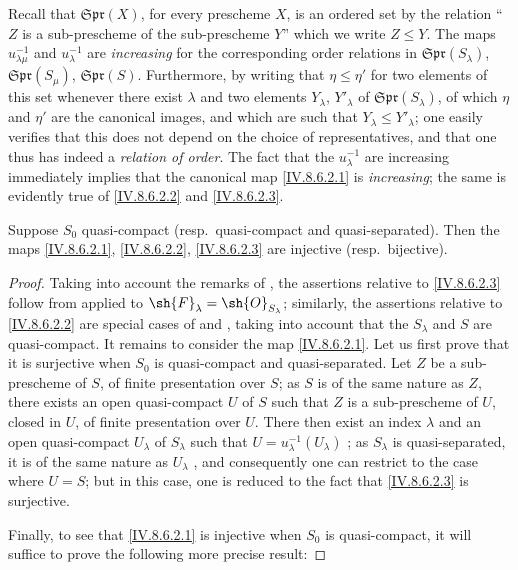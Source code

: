 
Recall  that $\mathfrak{Spr}(X)$, for every prescheme $X$, is an ordered set by the relation ``$Z$ is a sub-prescheme of the sub-prescheme $Y$'' which we write $Z\leqslant Y$.
The maps $u_{\lambda\mu}^{-1}$ and $u_\lambda^{-1}$ are \emph{increasing} for the corresponding order relations in $\mathfrak{Spr}(S_\lambda)$, $\mathfrak{Spr}(S_\mu)$, $\mathfrak{Spr}(S)$.
Furthermore, by writing that $\eta\leqslant\eta'$ for two elements of this set whenever there exist $\lambda$ and two elements $Y_\lambda$, $Y'_\lambda$ of $\mathfrak{Spr}(S_\lambda)$, of which $\eta$ and $\eta'$ are the canonical images, and which are such that $Y_\lambda\leqslant Y'_\lambda$; one easily verifies that this does not depend on the choice of representatives, and that one thus has indeed a \emph{relation of order}.
The fact that the $u_\lambda^{-1}$ are increasing immediately implies that the canonical map \eqref{IV.8.6.2.1} is \emph{increasing}; the same is evidently true of \eqref{IV.8.6.2.2} and \eqref{IV.8.6.2.3}.

\begin{proposition}[8.6.3]
\label{IV.8.6.3}
Suppose $S_0$ quasi-compact (resp.\ quasi-compact and quasi-separated).
Then the maps \eqref{IV.8.6.2.1}, \eqref{IV.8.6.2.2}, \eqref{IV.8.6.2.3} are injective (resp.\ bijective).
\end{proposition}

\begin{proof}
Taking into account the remarks of , the assertions relative to \eqref{IV.8.6.2.3} follow from  applied to $\sh{F}_\lambda=\sh{O}_{S_\lambda}$; similarly, the assertions relative to \eqref{IV.8.6.2.2} are special cases of  and , taking into account that the $S_\lambda$ and $S$ are quasi-compact.
It remains to consider the map \eqref{IV.8.6.2.1}.
Let us first prove that it is surjective when $S_0$ is quasi-compact and quasi-separated.
Let $Z$ be a sub-prescheme of $S$, of finite presentation over $S$; as $S$ is of the same nature as $Z$, there exists an open quasi-compact $U$ of $S$ such that $Z$ is a sub-prescheme of $U$, closed in $U$, of finite presentation over $U$.
There then exist an index $\lambda$ and an open quasi-compact $U_\lambda$ of $S_\lambda$ such that $U=u_\lambda^{-1}(U_\lambda)$ ; as $S_\lambda$ is quasi-separated, it is of the same nature as $U_\lambda$ , and consequently one can restrict to the case where $U=S$; but in this case, one is reduced to the fact that \eqref{IV.8.6.2.3} is surjective.

Finally, to see that \eqref{IV.8.6.2.1} is injective when $S_0$ is quasi-compact, it will suffice to prove the following more precise result:
\end{proof}

